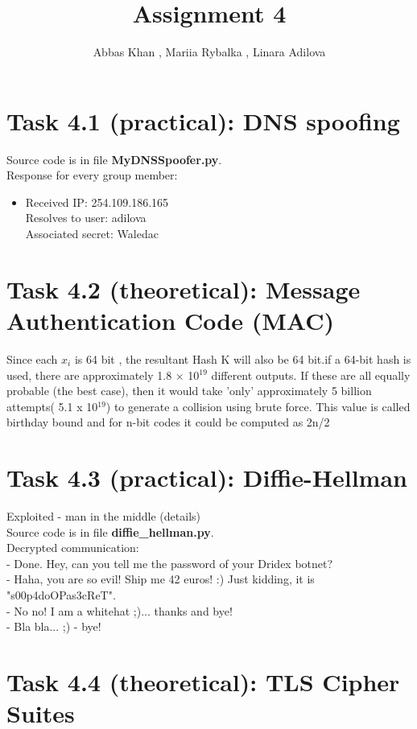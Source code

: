 \documentclass{article}
\title{Assignment 4}
\author{Abbas Khan , Mariia Rybalka , Linara Adilova}
\begin{document}
\maketitle 
    
\section*{Task 4.1 (practical): DNS spoofing}
Source code is in file \textbf{MyDNSSpoofer.py}.
\\
Response for every group member:
\begin{itemize}
\item
Received IP: 254.109.186.165
\\Resolves to user: adilova
\\Associated secret: Waledac
\end{itemize}


\section*{Task 4.2 (theoretical): Message Authentication Code (MAC)}
Since each $x_{i}$ is 64 bit , the resultant Hash K will also be 64 bit.if a 64-bit hash is used, there are approximately 1.8 × 10$^{19}$ different outputs. If these are all equally probable (the best case), then it would take 'only' approximately 5 billion attempts( 5.1 x 10$^{19}$) to generate a collision using brute force. This value is called birthday bound and for n-bit codes it could be computed as 2n/2\cite{birthday_attack}
\section*{Task 4.3 (practical): Diffie-Hellman}
Exploited - man in the middle (details)
\\
Source code is in file \textbf{diffie\_hellman.py}.
\\
Decrypted communication:
\\- Done. Hey, can you tell me the password of your Dridex botnet?
\\- Haha, you are so evil! Ship me 42 euros! :) Just kidding, it is "s00p4doOPas3cReT".
\\- No no! I am a whitehat ;)... thanks and bye!
\\- Bla bla... ;) - bye!

\section*{Task 4.4 (theoretical): TLS Cipher Suites}
\end{document}
